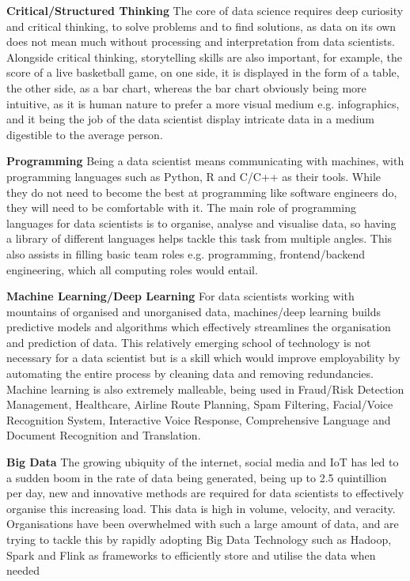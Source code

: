 \documentclass[a4paper, 11pt]{report}
\begin{document}
\textbf{Critical/Structured Thinking}
The core of data science requires deep curiosity and critical thinking, to solve problems and to find solutions, as data on its own does not mean much without processing and interpretation from data scientists. Alongside critical thinking, storytelling skills are also important, for example, the score of a live basketball game, on one side, it is displayed in the form of a table, the other side, as a bar chart, whereas the bar chart obviously being more intuitive, as it is human nature to prefer a more visual medium e.g. infographics, and it being the job of the data scientist display intricate data in a medium digestible to the average person.

\textbf{Programming}
Being a data scientist means communicating with machines, with programming languages such as Python, R and C/C++ as their tools. While they do not need to become the best at programming like software engineers do, they will need to be comfortable with it. The main role of programming languages for data scientists is to organise, analyse and visualise data, so having a library of different languages helps tackle this task from multiple angles. This also assists in filling basic team roles e.g. programming, frontend/backend engineering, which all computing roles would entail.

\textbf{Machine Learning/Deep Learning}
For data scientists working with mountains of organised and unorganised data, machines/deep learning builds predictive models and algorithms which effectively streamlines the organisation and prediction of data. This relatively emerging school of technology is not necessary for a data scientist but is a skill which would improve employability by automating the entire process by cleaning data and removing redundancies. Machine learning is also extremely malleable, being used in Fraud/Risk Detection Management, Healthcare, Airline Route Planning, Spam Filtering, Facial/Voice Recognition System, Interactive Voice Response, Comprehensive Language and Document Recognition and Translation.

\textbf{Big Data}
The growing ubiquity of the internet, social media and IoT has led to a sudden boom in the rate of data being generated, being up to 2.5 quintillion per day, new and innovative methods are required for data scientists to effectively organise this increasing load. This data is high in volume, velocity, and veracity. Organisations have been overwhelmed with such a large amount of data, and are trying to tackle this by rapidly adopting Big Data Technology such as Hadoop, Spark and Flink as frameworks to efficiently store and utilise the data when needed 
\end{document}
